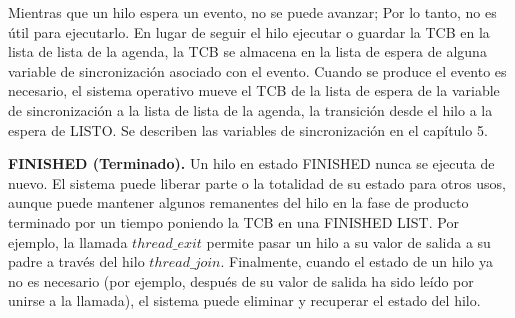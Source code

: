 \documentclass[10pt]{book}
\begin{document}
Mientras que un hilo espera un evento, no se puede avanzar; Por lo tanto, no es útil para ejecutarlo. En lugar de seguir el hilo ejecutar o guardar la TCB en la lista de lista de la agenda, la TCB se almacena en la lista de espera de alguna variable de sincronización asociado con el evento. Cuando se produce el evento es necesario, el sistema operativo mueve el TCB de la lista de espera de la variable de sincronización a la lista de lista de la agenda, la transición desde el hilo a la espera de LISTO. Se describen las variables de sincronización en el capítulo 5.

\textbf{FINISHED (Terminado).} Un hilo en estado FINISHED nunca se ejecuta de nuevo. El sistema puede liberar parte o la totalidad de su estado para otros usos, aunque puede mantener algunos remanentes del hilo en la fase de producto terminado por un tiempo poniendo la TCB en una FINISHED LIST. Por ejemplo, la llamada $thread\_ exit$ permite pasar un hilo a su valor de salida a su padre a través del hilo $thread\_ join$. Finalmente, cuando el estado de un hilo ya no es necesario (por ejemplo, después de su valor de salida ha sido leído por unirse a la llamada), el sistema puede eliminar y recuperar el estado del hilo.
\end{document}
